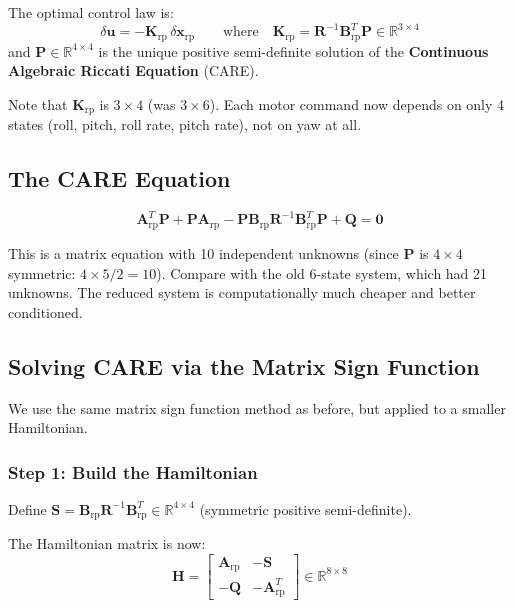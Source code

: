 \documentclass[12pt, a4paper]{article}
\newcommand{\R}{\mathbb{R}}
\newcommand{\bx}{\bm{x}}
\newcommand{\bu}{\bm{u}}
\newcommand{\bK}{\bm{K}}
\newcommand{\bA}{\bm{A}}
\newcommand{\bB}{\bm{B}}
\newcommand{\bP}{\bm{P}}
\newcommand{\bQ}{\bm{Q}}
\newcommand{\bR}{\bm{R}}
\newcommand{\bzero}{\bm{0}}
\begin{document}
The optimal control law is:
\begin{equation}
    \delta \bu = -\bK_{\text{rp}} \, \delta \bx_{\text{rp}}
    \qquad \text{where} \quad \bK_{\text{rp}} = \bR^{-1} \bB_{\text{rp}}^T \bP \in \R^{3 \times 4}
\end{equation}
and $\bP \in \R^{4 \times 4}$ is the unique positive semi-definite solution of the \textbf{Continuous Algebraic Riccati Equation} (CARE).

Note that $\bK_{\text{rp}}$ is $3 \times 4$ (was $3 \times 6$).  Each motor command now depends on only 4 states (roll, pitch, roll rate, pitch rate), not on yaw at all.

\subsection{The CARE Equation}

\begin{equation}
    \bA_{\text{rp}}^T \bP + \bP \bA_{\text{rp}} - \bP \bB_{\text{rp}} \bR^{-1} \bB_{\text{rp}}^T \bP + \bQ = \bzero
    \label{eq:care}
\end{equation}

This is a matrix equation with 10 independent unknowns (since $\bP$ is $4 \times 4$ symmetric: $4 \times 5 / 2 = 10$).  Compare with the old 6-state system, which had 21 unknowns.  The reduced system is computationally much cheaper and better conditioned.

\subsection{Solving CARE via the Matrix Sign Function}
\label{sec:sign_function}

We use the same matrix sign function method as before, but applied to a smaller Hamiltonian.

\subsubsection{Step 1: Build the Hamiltonian}

Define $\bm{S} = \bB_{\text{rp}} \bR^{-1} \bB_{\text{rp}}^T \in \R^{4\times4}$ (symmetric positive semi-definite).

The Hamiltonian matrix is now:
\begin{equation}
    \bm{H} = \begin{bmatrix}
        \bA_{\text{rp}} & -\bm{S} \\
        -\bQ & -\bA_{\text{rp}}^T
    \end{bmatrix}
    \in \R^{8 \times 8}
\end{equation}
\end{document}
